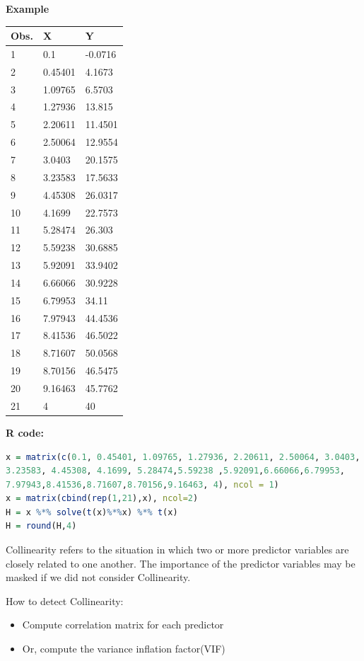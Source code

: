\documentclass[12pt,a4paper]{article}%
\theoremstyle{definition}
\theoremstyle{plain}
\numberwithin{equation}{section}
\newcounter{subsubsubsection}[subsubsection]
\begin{document}
\begin{framed}
\textbf{Example}\\

\begin{tabular}{lll}
Obs. & X  & Y   \\
\hline
1& 0.1& -0.0716\\
2& 0.45401& 4.1673\\
3& 1.09765& 6.5703\\
4& 1.27936& 13.815\\
5& 2.20611& 11.4501\\
6& 2.50064& 12.9554\\
7& 3.0403& 20.1575\\
8& 3.23583& 17.5633\\
9& 4.45308& 26.0317\\
10& 4.1699& 22.7573\\
11& 5.28474& 26.303\\
12& 5.59238& 30.6885\\
13& 5.92091& 33.9402\\
14& 6.66066& 30.9228\\
15& 6.79953& 34.11\\
16& 7.97943& 44.4536\\
17& 8.41536& 46.5022\\
18& 8.71607& 50.0568\\
19& 8.70156& 46.5475\\
20& 9.16463& 45.7762\\
21& 4& 40\\
\bottomrule
\end{tabular}


\textbf{R code:}
\footnotesize
\begin{lstlisting}[language=R]
x = matrix(c(0.1, 0.45401, 1.09765, 1.27936, 2.20611, 2.50064, 3.0403, 
3.23583, 4.45308, 4.1699, 5.28474,5.59238 ,5.92091,6.66066,6.79953,
7.97943,8.41536,8.71607,8.70156,9.16463, 4), ncol = 1)
x = matrix(cbind(rep(1,21),x), ncol=2)
H = x %*% solve(t(x)%*%x) %*% t(x)
H = round(H,4)
\end{lstlisting}
\end{framed}
\subsubsubsection{\color{blue}{Collinearity}}
Collinearity refers to the situation in which two or more predictor variables are closely related to one another. 
The importance of the predictor variables may be masked if we did not consider Collinearity. 

How to detect Collinearity:
\begin{itemize}
\item Compute correlation matrix for each predictor
\item Or, compute the variance inflation factor(VIF)
\end{itemize}
\end{document}
